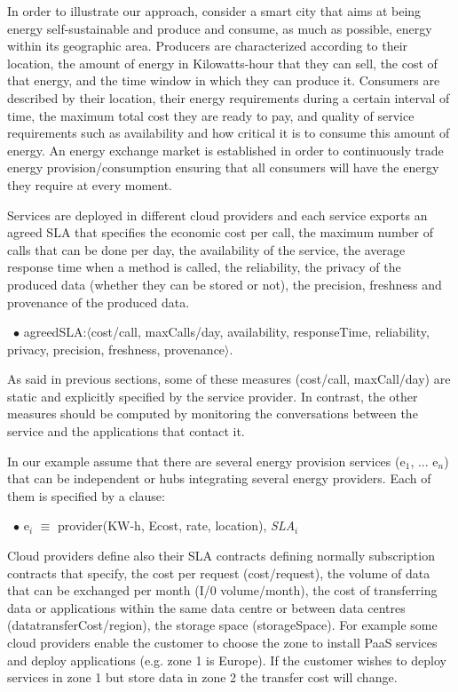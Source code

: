 In order to illustrate our approach, consider a smart city that aims at being energy self-sustainable and produce and consume, as much as possible, energy within its geographic area. 
Producers are characterized according to their location, the amount of energy in Kilowatts-hour that they can sell, the cost of that energy, and the time window in which they can produce it. 
Consumers are described by their location, their energy requirements during a certain interval of time, the maximum total cost they are ready to pay, and quality of service requirements such as availability and how critical it is to consume this amount of energy. 
An energy exchange market is established in order to continuously trade  energy provision/consumption ensuring that all consumers will have the energy they require at every moment.




Services are deployed in different cloud providers and each service exports an agreed SLA that specifies the economic cost per call, the maximum number of calls that can be done per day, the availability of the service, the average response time when a method is called, the reliability, the privacy of the produced data (whether they can be stored or not), the precision, freshness and provenance of the produced data. 

\begin{trivlist}\sf\footnotesize
\item[~$\bullet$ ] {\sf agreedSLA:$\langle$cost/call, maxCalls/day, availability, responseTime, reliability, privacy, precision, freshness, provenance$\rangle$}. 
 \end{trivlist}
 
As said in previous sections, some of these measures ({\sf cost/call, maxCall/day}) are static and explicitly specified by the service provider. 
In contrast, the other measures should be computed by monitoring the conversations between the service and the applications that contact it.  

In our example assume that there are several energy provision services ({\sf e$_1$, ... e$_n$}) that can be independent or hubs integrating several energy providers. 
Each of them is specified by a clause:
\begin{trivlist}\sf\footnotesize
\item[~$\bullet$ ]   e$_i$ $\equiv$ provider(KW-h, Ecost, rate, location), \textit{SLA}$_i$
\end{trivlist}

Cloud providers define also their SLA contracts defining normally subscription contracts that specify, the cost per request ({\sf cost/request}), the volume of data that can be exchanged per month ({\sf I/0 volume/month}), the cost of transferring data or applications within the same data centre or between data centres ({\sf datatransferCost/region}), the storage space ({\sf storageSpace}). For example some cloud providers enable the customer to choose the zone to install PaaS services and deploy applications (e.g. zone 1 is Europe). If the customer wishes to deploy services in zone 1 but store data in zone 2 the transfer cost will change.

